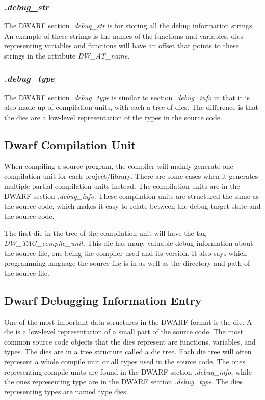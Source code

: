 \subsubsection{\emph{.debug\_str}}
The DWARF section \emph{.debug\_str} is for storing all the debug information strings.
An example of these strings is the names of the functions and variables.
\glspl{die} representing variables and functions will have an offset that points to these strings in the attribute \emph{DW\_AT\_name}. 


\subsubsection{\emph{.debug\_type}}
The \gls{DWARF} section \emph{.debug\_type} is similar to section \emph{.debug\_info} in that it is also made up of compilation units, with each a tree of \glspl{die}.
The difference is that the \glspl{die} are a low-level representation of the types in the source code.



\subsection{Dwarf Compilation Unit}
When compiling a source program, the compiler will mainly generate one compilation unit for each project/library.
There are some cases when it generates multiple partial compilation units instead.
The compilation units are in the \gls{DWARF} section \emph{.debug\_info}.
These compilation units are structured the same as the source code, which makes it easy to relate between the debug target state and the source code.


The first \gls{die} in the tree of the compilation unit will have the tag \emph{DW\_TAG\_compile\_unit}.
This \gls{die} has many valuable debug information about the source file, one being the compiler used and its version.
It also says which programming language the source file is in as well as the directory and path of the source file.



\subsection{Dwarf Debugging Information Entry}
One of the most important data structures in the \gls{DWARF} format is the \gls{die}.
A \gls{die} is a low-level representation of a small part of the source code.
The most common source code objects that the \glspl{die} represent are functions, variables, and types.
The \glspl{die} are in a tree structure called a \gls{die} tree.
Each \gls{die} tree will often represent a whole compile unit or all types used in the source code.
The ones representing compile units are found in the \gls{DWARF} section \emph{.debug\_info}, while the ones representing type are in the \gls{DWARF} section \emph{.debug\_type}.
The \glspl{die} representing types are named type \glspl{die}.


